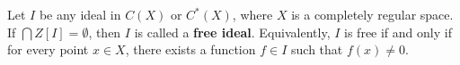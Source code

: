 Let $I$ be any ideal in $C(X)$ or $C^*(X)$, where $X$ is a completely regular space. If $\bigcap Z[I] = \emptyset$, then $I$ is called a \textbf{free ideal}. Equivalently, $I$ is free if and only if for every point $x \in X$, there exists a function $f \in I$ such that $f(x) \neq 0$.
